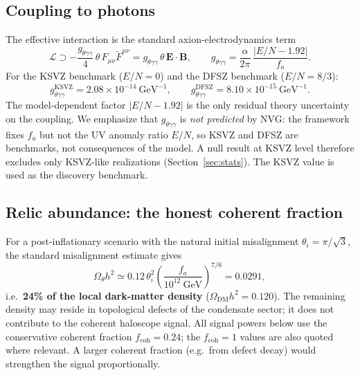 \documentclass[11pt,a4paper]{article}
\begin{document}
\subsection{Coupling to photons}

The effective interaction is the standard axion-electrodynamics term
\cite{Sikivie1983}
\begin{equation}
\mathcal{L} \supset -\frac{g_{\theta\gamma\gamma}}{4}\,
\theta\, F_{\mu\nu}\tilde F^{\mu\nu}
= g_{\theta\gamma\gamma}\,\theta\,\mathbf{E}\cdot\mathbf{B},
\qquad
g_{\theta\gamma\gamma} = \frac{\alpha}{2\pi}\,
\frac{|E/N - 1.92|}{f_a}.
\label{eq:gagg}
\end{equation}
For the KSVZ benchmark \cite{KSVZ} ($E/N = 0$) and the DFSZ benchmark
\cite{DFSZ} ($E/N = 8/3$):
\begin{equation}
g_{\theta\gamma\gamma}^{\mathrm{KSVZ}} = 2.08\times 10^{-14}~\text{GeV}^{-1},
\qquad
g_{\theta\gamma\gamma}^{\mathrm{DFSZ}} = 8.10\times 10^{-15}~\text{GeV}^{-1}.
\end{equation}
The model-dependent factor $|E/N - 1.92|$ is the only residual theory
uncertainty on the coupling. We emphasize that $g_{\theta\gamma\gamma}$ is
\emph{not predicted} by NVG: the framework fixes $f_a$ but not the UV anomaly
ratio $E/N$, so KSVZ and DFSZ are benchmarks, not consequences of the model.
A null result at KSVZ level therefore excludes only KSVZ-like realizations
(Section~\ref{sec:stats}). The KSVZ value is used as the discovery benchmark.

\subsection{Relic abundance: the honest coherent fraction}
\label{sec:abundance}

For a post-inflationary scenario with the natural initial misalignment
$\theta_i = \pi/\sqrt{3}$, the standard misalignment estimate
\cite{Misalignment} gives
\begin{equation}
\Omega_\theta h^2 \simeq 0.12\,\theta_i^2
\left(\frac{f_a}{10^{12}~\text{GeV}}\right)^{7/6}
= 0.0291,
\end{equation}
i.e.\ \textbf{24\% of the local dark-matter density}
($\Omega_{\mathrm{DM}} h^2 = 0.120$). The remaining density may reside in
topological defects of the condensate sector; it does not contribute to the
coherent haloscope signal. All signal powers below use the conservative coherent
fraction $f_{\mathrm{coh}} = 0.24$; the $f_{\mathrm{coh}}=1$ values are also
quoted where relevant. A larger coherent fraction (e.g.\ from defect decay)
would strengthen the signal proportionally.
\end{document}
